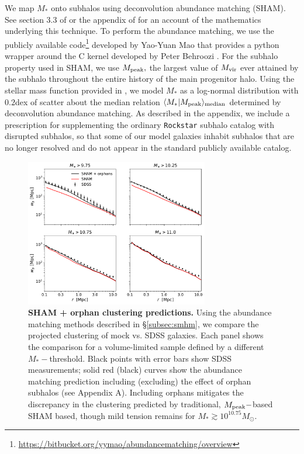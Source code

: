 \documentclass[usenatbib,usegraphicx,letterpaper]{mn2e}
\newcommand{\mstar}{M_{\ast}}
\newcommand{\mvir}{M_{\rm vir}}
\newcommand{\mpeak}{M_{\rm peak}}
\newcommand{\median}[2]{\langle{#1}\vert{#2}\rangle_{\rm median}}
\newcommand{\msun}{M_\odot}
\begin{document}
We map $\mstar$ onto subhalos using deconvolution abundance matching (SHAM). See section 3.3 of \citet{behroozi_etal10} or the appendix of \citet{kravtsov_etal14} for an account of the mathematics underlying this technique. To perform the abundance matching, we use the publicly available code\footnote{\url{https://bitbucket.org/yymao/abundancematching/overview}} developed by Yao-Yuan Mao \citep{lehmann_etal15} that provides a python wrapper around the C kernel developed by Peter Behroozi \citep{behroozi_etal10}. For the subhalo property used in SHAM, we use $\mpeak,$ the largest value of $\mvir$ ever attained by the subhalo throughout the entire history of the main progenitor halo.  Using the stellar mass function provided in \citet{moustakas_etal13}, we model $\mstar$ as a log-normal distribution with $0.2$dex of scatter about the median relation $\median{\mstar}{\mpeak}$ determined by deconvolution abundance matching. As described in the appendix, we include a prescription for supplementing the ordinary {\tt Rockstar} subhalo catalog with disrupted subhalos, so that some of our model galaxies inhabit subhalos that are no longer resolved and do not appear in the standard publicly available catalog. 

\begin{figure}
\centering
\includegraphics[width=8cm]{FIGS/baseline_sham_orphans.pdf}
\caption{
{\bf SHAM + orphan clustering predictions.}
Using the abundance matching methods described in \S\ref{subsec:smhm}, we compare the projected clustering of mock vs. SDSS galaxies. Each panel shows the comparison for a volume-limited sample defined by a different $\mstar-$threshold. Black points with error bars show SDSS measurements; solid red (black) curves show the abundance matching prediction including (excluding) the effect of orphan subhalos (see Appendix A). Including orphans mitigates the discrepancy in the clustering predicted by traditional, $\mpeak-$based SHAM based, though mild tension remains for $\mstar\gtrsim10^{10.75}\msun.$
}
\label{fig:baseline_sham_clustering}
\end{figure}
\end{document}
